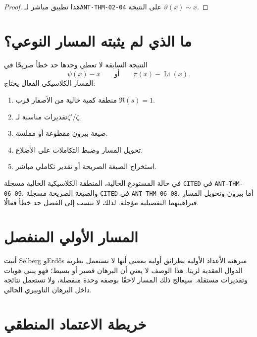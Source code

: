 \begin{proof}
هذا تطبيق مباشر لـ\textenglish{\texttt{ANT-THM-02-04}} على النتيجة
\(\vartheta(x)\sim x\).
\end{proof}

\section{ما الذي لم يثبته المسار النوعي؟}

النتيجة السابقة لا تعطي وحدها حد خطأ صريحًا في
\[
\psi(x)-x
\qquad\text{أو}\qquad
\pi(x)-\operatorname{Li}(x).
\]
المسار الكلاسيكي الفعال يحتاج:
\begin{enumerate}
  \item منطقة كمية خالية من الأصفار قرب \(\Re(s)=1\).
  \item تقديرات مناسبة لـ\(\zeta'/\zeta\).
  \item صيغة بيرون مقطوعة أو مملسة.
  \item تحويل المسار وضبط التكاملات على الأضلاع.
  \item استخراج الصيغة الصريحة أو تقدير تكاملي مباشر.
\end{enumerate}

في حالة المستودع الحالية، المنطقة الكلاسيكية الخالية مسجلة
\textenglish{\texttt{CITED}} في \textenglish{\texttt{ANT-THM-06-09}}،
والصيغة الصريحة مسجلة \textenglish{\texttt{CITED}} في
\textenglish{\texttt{ANT-THM-06-08}}، أما بيرون وتحويل المسار فبراهينهما
التفصيلية مؤجلة. لذلك لا ننسب إلى الفصل حد خطأ فعالًا.

\section{المسار الأولي المنفصل}

أثبت Selberg وErdős مبرهنة الأعداد الأولية بطرائق أولية بمعنى أنها لا
تستعمل نظرية الدوال العقدية لزيتا. هذا الوصف لا يعني أن البرهان قصير أو
بسيط؛ فهو يبني هويات وتقديرات مستقلة. سيعالج ذلك المسار لاحقًا بوصفه وحدة
منفصلة، ولا تستعمل نتائجه داخل البرهان التاوبيري الحالي.

\section{خريطة الاعتماد المنطقي}

